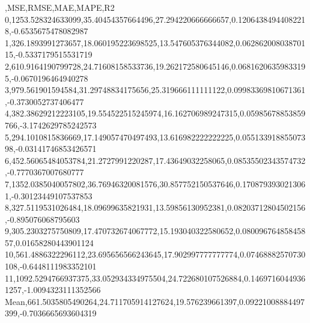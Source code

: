 ,MSE,RMSE,MAE,MAPE,R2
0,1253.528324633099,35.40454357664496,27.294220666666657,0.12064384944082218,-0.6535675478082987
1,326.1893991273657,18.060195223698525,13.547605376344082,0.06286200803870115,-0.5337179515531719
2,610.9164190799728,24.71608158533736,19.262172580645146,0.06816206359833195,-0.0670196464940278
3,979.561901594584,31.29748834175656,25.319666111111122,0.09983369810671361,-0.3730052737406477
4,382.38629212223105,19.554522515245974,16.162706989247315,0.05985678853859766,-3.1742629785242573
5,294.1010815836669,17.149057470497493,13.616982222222225,0.05513391885507398,-0.03141746853426571
6,452.56065484053784,21.2727991220287,17.43649032258065,0.08535502343574732,-0.7770367007680777
7,1352.0385040057802,36.76946320081576,30.857752150537646,0.1708793930213061,-0.30123449107537853
8,327.5119531026484,18.09699635821931,13.59856130952381,0.08203712804502156,-0.895076068795603
9,305.2303275750809,17.470732674067772,15.193040322580652,0.08009676485845857,0.01658280443901124
10,561.4886322296112,23.695656566243645,17.902997777777774,0.07468882570730108,-0.6448111983352101
11,1092.5294766937375,33.052934334975504,24.722680107526884,0.14697160449361257,-1.0094323111352566
Mean,661.5035805490264,24.711705914127624,19.576239661397,0.09221008884497399,-0.7036665693604319

